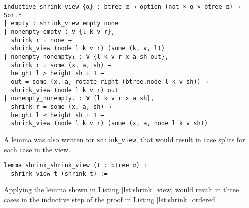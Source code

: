 \begin{lstlisting}[caption=\empty]
inductive shrink_view {α} : btree α → option (nat × α × btree α) → Sort*
| empty : shrink_view empty none
| nonempty_empty : ∀ {l k v r},
  shrink r = none →
  shrink_view (node l k v r) (some (k, v, l))
| nonempty_nonempty₁ : ∀ {l k v r x a sh out},
  shrink r = some (x, a, sh) →
  height l > height sh + 1 →
  out = some (x, a, rotate_right (btree.node l k v sh)) →
  shrink_view (node l k v r) out
| nonempty_nonempty₂ : ∀ {l k v r x a sh},
  shrink r = some (x, a, sh) →
  height l ≤ height sh + 1 →
  shrink_view (node l k v r) (some (x, a, node l k v sh))
\end{lstlisting}

A lemma was also written for \lstinline{shrink_view}, that would result in case splits for each case in the view. 

\begin{lstlisting}[caption=\empty, label={lst:shrink_view}]
lemma shrink_shrink_view (t : btree α) : 
  shrink_view t (shrink t) :=
\end{lstlisting}

Applying the lemma shown in Listing \ref{lst:shrink_view} would result in three cases in the inductive step of the proof in Listing \ref{lst:shrink_ordered}.